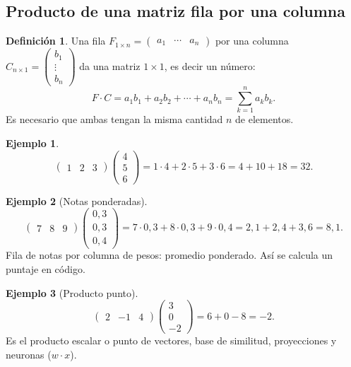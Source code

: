 \documentclass[a4paper,12pt]{article}
\theoremstyle{definition}
\newtheorem{definicion}{Definición}[section]
\newtheorem{ejemplo}{Ejemplo}[section]
\begin{document}
\subsection{Producto de una matriz fila por una columna}
\begin{definicion}
Una fila $F_{1 \times n} = \begin{pmatrix} a_1 & \cdots & a_n \end{pmatrix}$ por una columna $C_{n \times 1} = \begin{pmatrix} b_1 \\ \vdots \\ b_n \end{pmatrix}$ da una matriz $1 \times 1$, es decir un número:
\[
F \cdot C = a_1b_1+a_2b_2+\cdots+a_nb_n = \sum_{k=1}^{n} a_kb_k.
\]
Es necesario que ambas tengan la misma cantidad $n$ de elementos.
\end{definicion}

\begin{ejemplo}
\[
\begin{pmatrix} 1 & 2 & 3 \end{pmatrix} \begin{pmatrix} 4 \\ 5 \\ 6 \end{pmatrix} = 1\cdot 4+2\cdot 5+3\cdot 6 = 4+10+18 = 32.
\]
\end{ejemplo}

\begin{ejemplo}[Notas ponderadas]
\[
\begin{pmatrix} 7 & 8 & 9 \end{pmatrix} \begin{pmatrix} 0{,}3 \\ 0{,}3 \\ 0{,}4 \end{pmatrix} = 7\cdot 0{,}3+8\cdot 0{,}3+9\cdot 0{,}4 = 2{,}1+2{,}4+3{,}6 = 8{,}1.
\]
Fila de notas por columna de pesos: promedio ponderado. Así se calcula un puntaje en código.
\end{ejemplo}

\begin{ejemplo}[Producto punto]
\[
\begin{pmatrix} 2 & -1 & 4 \end{pmatrix} \begin{pmatrix} 3 \\ 0 \\ -2 \end{pmatrix} = 6+0-8 = -2.
\]
Es el producto escalar o punto de vectores, base de similitud, proyecciones y neuronas ($w \cdot x$).
\end{ejemplo}
\end{document}

